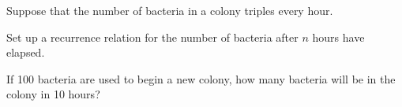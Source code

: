 
%
%
%

	Suppose that the number of bacteria in a colony triples every hour.
	\begin{subproblem}
		\item Set up a recurrence relation for the number of bacteria after $n$ hours have elapsed.
		\item If 100 bacteria are used to begin a new colony, how many bacteria will be in the colony in 10 hours?
	\end{subproblem}

\solution
	\begin{subproblem}
		\item 
		\item 
	\end{subproblem}

